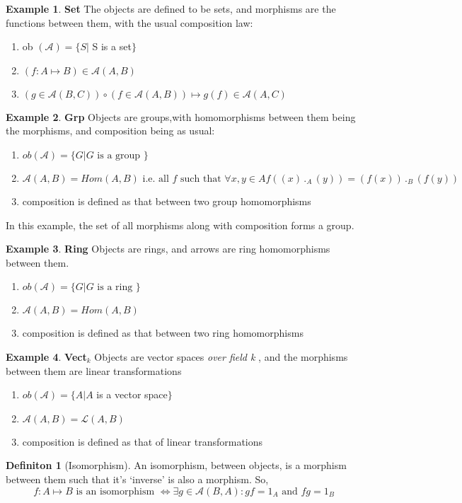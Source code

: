 \documentclass{article}
\theoremstyle{definition}
\newtheorem{example}{Example}[section]
\theoremstyle{definition}
\newtheorem{definition}{Definiton}[section]
\begin{document}
\begin{example}{\textbf{Set}} %
	The objects are defined to be sets, and morphisms are the functions between them, with the usual composition law:
	\begin{enumerate}[label=\roman*] %
	\item ob $ (\mathcal{A}) = \{ S | $  S is a set$ \} $
	\item $  (f:A \mapsto B )\in \mathcal{A}(A,B)$
	\item  $ (g \in \mathcal{A}(B,C))  \circ (f \in \mathcal{A}(A,B)) \mapsto  g(f) \in \mathcal{A}(A,C) $
	\end{enumerate}
\end{example}
\begin{example}{\textbf{Grp}} %
Objects are groups,with homomorphisms between them being the morphisms, and composition being as usual:
	\begin{enumerate}[label=\roman*]
	\item $  ob(\mathcal{A} ) = \{G| G \text{ is a group } \}  $
	\item $ \mathcal{A} (A,B)= Hom(A,B) \text{ i.e. all } f \text{ such that } \forall x,y \in A f((x) \, ._A \, (y))=(f(x)) \,._B\,(f(y))      $
	\item  composition is defined as that between two group homomorphisms
\end{enumerate}
In this example, the set of all morphisms along with composition forms a group.
\end{example}
\begin{example}{\textbf{Ring}} %
Objects are rings, and arrows are ring homomorphisms between them.
\begin{enumerate}[label=\roman*]
	\item $  ob(\mathcal{A} ) = \{G| G \text{ is a ring } \}  $
	\item $ \mathcal{A} (A,B) = Hom(A,B) $
	\item  composition is defined as that between two ring homomorphisms
\end{enumerate}
\end{example}
\begin{example}{\textbf{Vect$ _k$ }} %
Objects are vector spaces \textit{over field k} , and the morphisms between them are linear transformations
	\begin{enumerate}[label=\roman*]
	\item $ ob(\mathcal{A} ) = \{A | A $ is  a vector space$   \}$
	\item $ \mathcal{A} (A,B) = \mathcal{L} (A,B) $
	\item  composition is defined as that of linear transformations
\end{enumerate}
\end{example}
\begin{definition}[Isomorphism] %
	An isomorphism, between objects, is a morphism between them such that it's `inverse' is also a morphism. So,
	\[ f: A \mapsto B \text{ is an isomorphism } \iff \exists g \in \mathcal{A}(B,A): gf=1_A \text{ and } fg=1_B\]
\end{definition}
\end{document}
